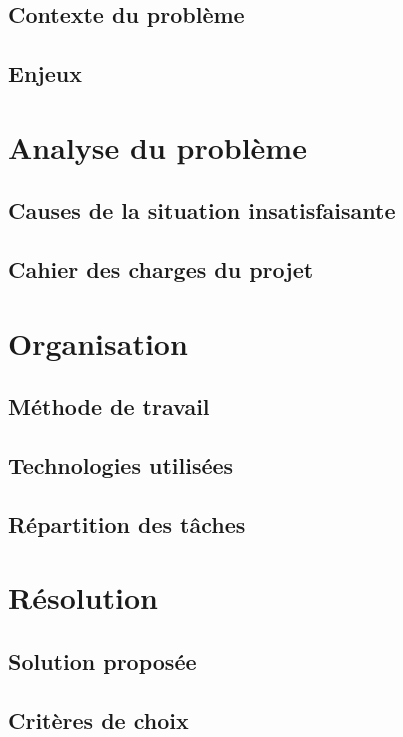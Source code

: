 \documentclass[pidr]{tnreport}
\begin{document}
\section{Contexte du problème}

\section{Enjeux}

\chapter{Analyse du problème}

\section{Causes de la situation insatisfaisante}

\section{Cahier des charges du projet}

\chapter{Organisation}

\section{Méthode de travail}

\section{Technologies utilisées}

\section{Répartition des tâches}

\chapter{Résolution}

\section{Solution proposée}

\section{Critères de choix}
\end{document}
